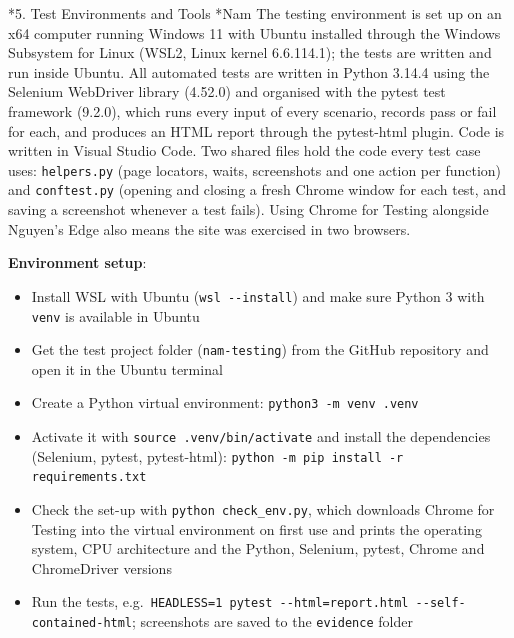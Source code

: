 \documentclass[11pt,a4paper]{article}
\makeatletter
\renewcommand\section{\@startsection{section}{1}{0pt}{3ex plus 1ex}{1.2ex}{\LARGE\bfseries}}
\renewcommand\subsection{\@startsection{subsection}{2}{0pt}{2ex plus .5ex}{.8ex}{\Large\bfseries}}
\makeatother
\begin{document}
\section*{5. Test Environments and Tools}
\subsection*{Nam}
The testing environment is set up on an x64 computer running Windows 11 with Ubuntu installed through the Windows Subsystem for Linux (WSL2, Linux kernel 6.6.114.1); the tests are written and run inside Ubuntu. All automated tests are written in Python 3.14.4 using the Selenium WebDriver library (4.52.0) and organised with the pytest test framework (9.2.0), which runs every input of every scenario, records pass or fail for each, and produces an HTML report through the pytest-html plugin. Code is written in Visual Studio Code. Two shared files hold the code every test case uses: \texttt{helpers.py} (page locators, waits, screenshots and one action per function) and \texttt{conftest.py} (opening and closing a fresh Chrome window for each test, and saving a screenshot whenever a test fails). Using Chrome for Testing alongside Nguyen's Edge also means the site was exercised in two browsers.

\textbf{Environment setup}:
\begin{itemize}
\item Install WSL with Ubuntu (\texttt{wsl -{}-install}) and make sure Python 3 with \texttt{venv} is available in Ubuntu
\item Get the test project folder (\texttt{nam-testing}) from the GitHub repository and open it in the Ubuntu terminal
\item Create a Python virtual environment: \texttt{python3 -m venv .venv}
\item Activate it with \texttt{source .venv/bin/activate} and install the dependencies (Selenium, pytest, pytest-html): \texttt{python -m pip install -r requirements.txt}
\item Check the set-up with \texttt{python check\_env.py}, which downloads Chrome for Testing into the virtual environment on first use and prints the operating system, CPU architecture and the Python, Selenium, pytest, Chrome and ChromeDriver versions
\item Run the tests, e.g.\ \texttt{HEADLESS=1 pytest -{}-html=report.html -{}-self-contained-html}; screenshots are saved to the \texttt{evidence} folder
\end{itemize}
\end{document}
